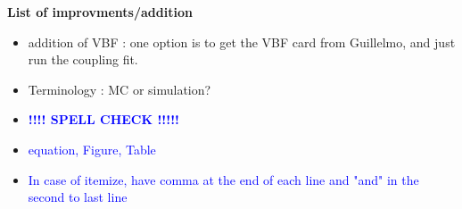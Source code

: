 
\begin{center}
\LARGE \textbf{List of improvments/addition}  \\
\end{center}
\vspace{1cm}

\normalsize
\begin{itemize}






\item 
addition of VBF : one option is to get the VBF card from Guillelmo, 
and just run the coupling fit. 



\item 
Terminology : MC or simulation?

\item 
\textcolor{blue}{\textbf{!!!! SPELL CHECK !!!!!}} 
\item 
\textcolor{blue}{equation, Figure, Table}
\item 
\textcolor{blue}{In case of itemize, have comma at the end of each line 
                 and "and" in the second to last line} 


\end{itemize}
